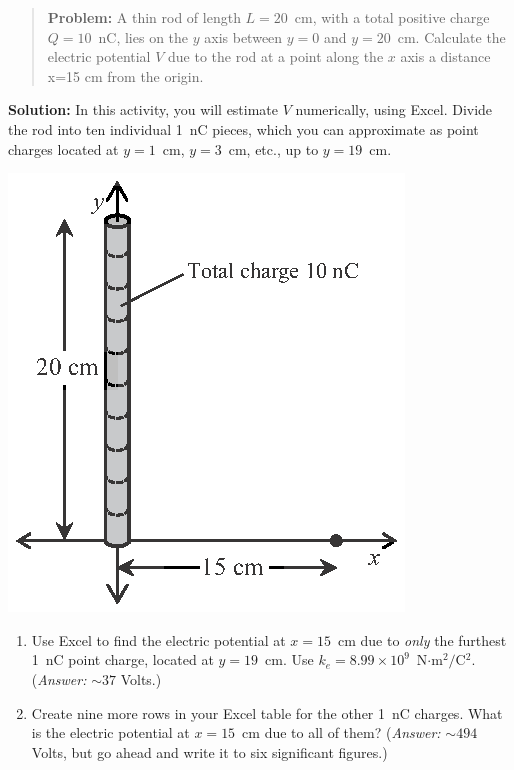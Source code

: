 \begin{minipage}{0.64\textwidth}
\begin{quote}
\textbf{Problem:} A thin rod of length $L=20$~cm, with a total positive charge $Q=10$~nC, lies on the $y$ axis between $y=0$ and $y=20$~cm.  Calculate the electric potential $V$ due to the rod at a point along the $x$ axis a distance x=15 cm from the origin. 
\end{quote}

\textbf{Solution:} In this activity, you will estimate $V$ numerically, using Excel.  Divide the rod into ten individual 1~nC pieces, which you can approximate as point charges located at $y=1$~cm, $y=3$~cm, etc., up to $y=19$~cm.  
\end{minipage}
\begin{minipage}{0.35\textwidth}
\vspace{-0.3in}
\raggedleft \includegraphics[scale=0.9]{potential_charge_distributions/rod_axes.eps}
\end{minipage}

\begin{enumerate}[wide, label=(\emph{\alph*})]

\item Use Excel to find the electric potential at $x=15$~cm due to \textit{only} the furthest 1~nC point charge, located at $y=19$~cm.  Use $k_e=8.99 \times 10^9$~N$\cdot$m$^2/$C$^2$.  (\textit{Answer:} $\sim 37$ Volts.)
\answerspace{0.5in}

\item Create nine more rows in your Excel table for the other 1~nC charges.  What is the electric potential at $x=15$~cm due to all of them?  (\textit{Answer:} $\sim 494$ Volts, but go ahead and write it to six significant figures.) 
\answerspace{0.5in}

\end{enumerate}

